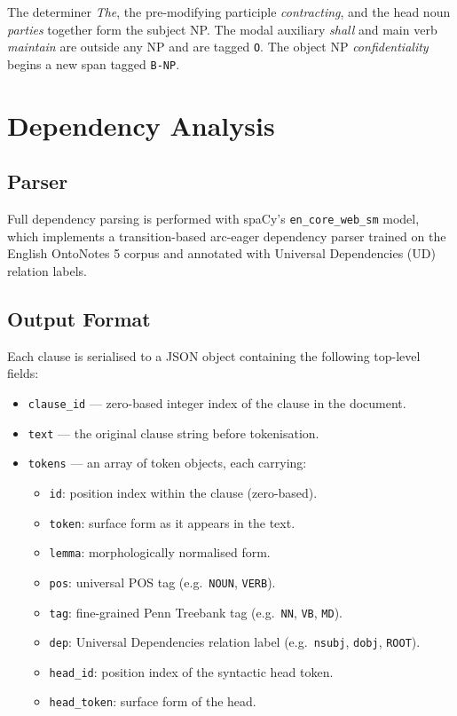 \documentclass[assignment.tex]{subfiles}
\begin{document}
The determiner \textit{The}, the pre-modifying participle \textit{contracting}, and
the head noun \textit{parties} together form the subject NP.  The modal auxiliary
\textit{shall} and main verb \textit{maintain} are outside any NP and are tagged
\texttt{O}.  The object NP \textit{confidentiality} begins a new span tagged
\texttt{B-NP}.

\section{Dependency Analysis}
\label{subsec:dependency-parsing}

\subsection{Parser}

Full dependency parsing is performed with spaCy's \texttt{en\_core\_web\_sm} model,
which implements a transition-based arc-eager dependency parser trained on the
English OntoNotes 5 corpus and annotated with Universal Dependencies (UD) relation
labels.

\subsection{Output Format}

Each clause is serialised to a JSON object containing the following top-level
fields:

\begin{itemize}[leftmargin=*, itemsep=2pt]
    \item \texttt{clause\_id} — zero-based integer index of the clause in the
          document.
    \item \texttt{text} — the original clause string before tokenisation.
    \item \texttt{tokens} — an array of token objects, each carrying:
    \begin{itemize}
        \item \texttt{id}: position index within the clause (zero-based).
        \item \texttt{token}: surface form as it appears in the text.
        \item \texttt{lemma}: morphologically normalised form.
        \item \texttt{pos}: universal POS tag (e.g.\ \texttt{NOUN}, \texttt{VERB}).
        \item \texttt{tag}: fine-grained Penn Treebank tag
              (e.g.\ \texttt{NN}, \texttt{VB}, \texttt{MD}).
        \item \texttt{dep}: Universal Dependencies relation label
              (e.g.\ \texttt{nsubj}, \texttt{dobj}, \texttt{ROOT}).
        \item \texttt{head\_id}: position index of the syntactic head token.
        \item \texttt{head\_token}: surface form of the head.
    \end{itemize}
\end{itemize}
\end{document}
